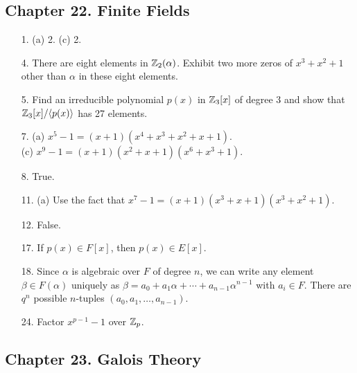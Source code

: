 \subsection*{Chapter 22. Finite Fields}
 
{\small
\begin{itemize}

\item[1.]
(a) 2.
(c) 2.
 
\item[4.] 
There are eight elements in ${\Bbb Z}_2(\alpha)$. Exhibit two more
zeros of $x^3 + x^2 + 1$ other than $\alpha$ in these eight elements. 
 
\item[5.] 
Find an irreducible polynomial $p(x)$ in ${\Bbb Z}_3[x]$ of degree
3 and show that ${\Bbb Z}_3[x]/ \langle p(x) \rangle$ has 27
elements. 

\item[7.]
(a) $x^5 -1 = (x+1)(x^4+x^3 + x^2 + x+ 1)$. \\
(c) $x^9 -1 = (x+1)( x^2 + x+ 1)(x^6+x^3+1)$.
 
\item[8.]
True.

\item[11.]
(a) Use the fact that $x^7 -1 = (x+1)( x^3 + x+ 1)(x^3+x^2+1)$.

\item[12.]
False.

\item[17.]
If $p(x) \in F[x]$, then $p(x) \in E[x]$.


\item[18.]
Since $\alpha$ is algebraic over $F$ of degree $n$, we can write any
element $\beta \in F(\alpha)$ uniquely as $\beta = a_0  + a_1 \alpha +
\cdots + a_{n-1} \alpha^{n-1}$ with $a_i \in F$. There are $q^n$
possible $n$-tuples $(a_0, a_1, \ldots, a_{n-1})$.


\item[24.]
Factor $x^{p-1} - 1$ over ${\Bbb Z}_p$.


\end{itemize}
}
 
\subsection*{Chapter 23. Galois Theory}
 
